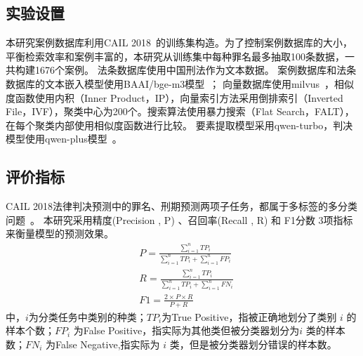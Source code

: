 \subsection{\heiti 实验设置}
本研究案例数据库利用CAIL 2018~\cite{xiao2018cail2018largescalelegaldataset}的训练集构造。为了控制案例数据库的大小，平衡检索效率和案例丰富的，本研究从训练集中每种罪名最多抽取100条数据，一共构建1676个案例。
法条数据库使用中国刑法作为文本数据。
案例数据库和法条数据库的文本嵌入模型使用BAAI/bge-m3模型~\cite{chenBGEM3EmbeddingMultiLingual2024}；
向量数据库使用milvus~\cite{2022manu,2021milvus}，相似度函数使用内积（Inner Product，IP），向量索引方法采用倒排索引（Inverted File，IVF），聚类中心为200个。搜索算法使用暴力搜索（Flat Search，FALT），在每个聚类内部使用相似度函数进行比较。
要素提取模型采用qwen-turbo，判决模型使用qwen-plus模型~\cite{qwenQwen25TechnicalReport2025}。

\subsection{\heiti 评价指标}
CAIL 2018法律判决预测中的罪名、刑期预测两项子任务，都属于多标签的多分类问题~\cite{xiao2018cail2018}。
本研究采用精度(Precision , P) 、召回率(Recall , R) 和 F1分数 3项指标来衡量模型的预测效果。
\begin{eqnarray}
	&P=\frac{\sum_{i=1}^{n}TP_{i}}{\sum_{i=1}^{n}TP_{i}+\sum_{i=1}^{n}FP_{i}}
	\\
	&R=\frac{\sum_{i=1}^{n}TP_{i}}{\sum_{i=1}^{n}TP_{i}+\sum_{i=1}^{n}FN_{i}}
	\\
	&F1=\frac{2\times P\times R}{P+R}
\end{eqnarray}
中，$i$为分类任务中类别的种类；$TP_i$为True Positive，指被正确地划分了类别 $i$ 的样本个数；$FP_i$ 为False Positive，指实际为其他类但被分类器划分为$i$ 类的样本数；$FN_i$ 为False Negative,指实际为 $i$ 类，但是被分类器划分错误的样本数。


